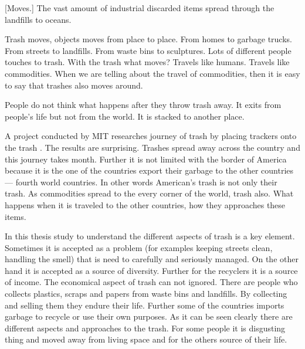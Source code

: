 %
%
[Moves.] The vast amount of industrial discarded items spread through the landfills to oceans.

Trash moves, objects moves from place to place. From homes to garbage trucks. From streets to landfills. From waste bins to sculptures. Lots of different people touches to trash. With the trash what moves? Travels like humans. Travels like commodities. When we are telling about the travel of commodities, then it is easy to say that trashes also moves around. 

People do not think what happens after they throw trash away.  It exits from people's life but not from the world. It is stacked to another place. 

A project conducted by MIT researches journey of trash by placing trackers onto the trash \cite{chen2009mit}. The results are surprising. Trashes spread away across the country and this journey takes month. Further it is not limited with the border of America because it is the one of the countries export their garbage to the other countries --- fourth world countries. In other words American's trash is not only their trash. As commodities spread to the every corner of the world, trash also. What happens when it is traveled to the other countries, how they approaches these items.  





%
%
In this thesis study to understand the different aspects of trash is a key element. Sometimes it is accepted as a problem (for examples keeping streets clean, handling the smell) that is need to carefully and seriously managed. On the other hand it is accepted as a source of diversity. Further for the recyclers it is a source of income. The economical aspect of trash can not ignored. There are people who collects plastics, scraps and papers from waste bins and landfills. By collecting and selling them they endure their life. Further some of the countries  imports garbage to recycle or use their own purposes. As it can be seen clearly there are different aspects and approaches to the trash. For some people it is disgusting thing and moved away from living space and for the others source of their life. 

